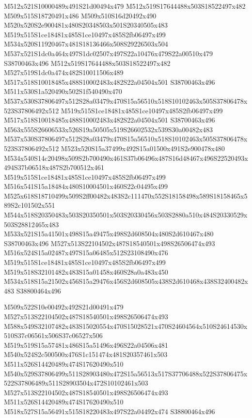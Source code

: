 \documentclass{article}
\begin{document}
\begin{multicols}{2}
M512x521S10000489x491S21d00494x479 M512x519S17644488x503S18522497x482 M509x515S18720491x486 M509x510S16d20492x490 M520x520S2e900481x480S20348503x501S20340505x483 M519x515S1ce18481x485S1ce10497x485S2fb06497x499 M534x520S11920467x481S18136466x508S29226503x504 M537x521S1dc0a464x497S1dc02507x497S22a10476x479S22a00510x479 S38700463x496 M512x519S17644488x503S18522497x482 M527x519S1dc0a474x482S10011506x489 M517x518S10018485x488S10002483x482S22a04504x501 S38700463x496 M511x530S1a520490x502S1f540490x470 M537x530S37806497x512S28a03479x470S15a56510x518S10102463x505S37806478x523S37806492x512 M519x515S1ce18481x485S1ce10497x485S2fb06497x499 M517x518S10018485x488S10002483x482S22a04504x501 S38700463x496 M563x555S26606533x526S19a50505x519S26602532x539S30a00482x483 M537x530S37806497x512S28a03479x470S15a56510x518S10102463x505S37806478x523S37806492x512 M523x520S15a37499x492S15a01500x491S2e900478x480 M534x540S14c20498x509S2b700490x461S37b06496x487S16d48467x496S22520493x494S37b06518x487S2b700512x461 M519x515S1ce18481x485S1ce10497x485S2fb06497x499 M516x541S15a18484x480S10004501x460S22c04495x499 M525x618S18710499x509S2ff00482x483S2c111470x552S18158498x589S18158465x589S2c101502x551 M544x518S20350483x503S20350501x503S20330456x503S2880a510x484S20330529x503S28812465x483 M533x521S15a41501x498S15a49475x498S2d608504x480S2d610467x480 S38700463x496 M527x513S22104502x487S18540501x498S26506474x493 M516x524S15a02487x497S15a06485x512S23108490x476 M519x515S1ce18481x485S1ce10497x485S2fb06497x499 M519x518S32101482x483S15a01458x460S28a0a483x450 M534x518S15a21502x456S15a29476x456S2d608505x438S2d610468x438S32400482x483 S38800464x496

M509x522S10e00492x492S21d00491x479 M527x513S22104502x487S18540501x498S26506474x493 M588x549S32107482x483S15020554x470S15028521x470S24604564x510S24614530x510S37c06561x506S37c06527x506 M519x519S15a57481x486S15a51496x496S22a04506x481 M540x524S2c500500x476S1c151474x481S20357461x503 M511x526S14420489x474S17620490x510 M540x529S37806499x511S28903480x472S15a56513x517S37706488x522S37806475x522S37806489x511S28903504x472S10102461x503 M527x513S22104502x487S18540501x498S26506474x493 M511x526S14420489x474S17620490x510 M518x527S15a56491x515S18220483x497S22a04492x474 S38800464x496


\end{multicols}
\end{document}
